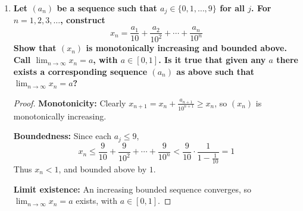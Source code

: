 \documentclass[14pt]{extarticle}
\begin{document}
\begin{enumerate}
\begin{proof}
Simplify the denominator: $2n+2=2(n+1)$, so
\begin{align*}
\frac{(n+1)(2n+1)^2}{n\cdot 4(n+1)^2} &= \frac{(2n+1)^2}{4n(n+1)} \\
&= \frac{4n^2 +4n +1}{4n(n+1)} \\
&= 1 + \frac{1}{4n(n+1)} > 1
\end{align*}

Hence
\[
(n+1)x_{n+1}^2 > n x_n^2
\]
so $nx_n^2$ is monotonically increasing

\medskip

Consider the ratio
\[
\frac{(n+3/2)x_{n+1}^2}{(n+1/2)x_n^2} = \frac{n+3/2}{n+1/2} \left(\frac{2n+1}{2n+2}\right)^2
= \frac{n+3/2}{n+1/2} \cdot \frac{(2n+1)^2}{(2n+2)^2}
\]

Write $2n+2 = 2(n+1)$:
\begin{align*}
\frac{n+3/2}{n+1/2} \cdot \frac{(2n+1)^2}{4(n+1)^2} &= \frac{2n+3}{2n+1} \cdot \frac{(2n+1)^2}{4(n+1)^2}\\ &= \frac{2n+3}{4(n+1)^2} (2n+1)
\\&= \frac{(2n+1)(2n+3)}{4(n+1)^2}
\end{align*}

Observe
\[
(2n+1)(2n+3) = 4n^2 + 8n +3 < 4n^2 + 8n +4 = 4(n+1)^2
\]

Thus the ratio is less than $1$, so 
\[
\bigl(n+\frac12\bigr)x_n^2
\] 
is monotonically decreasing

\end{proof}


\newpage
\item \textbf{Let $(a_n)$ be a sequence such that $a_j\in\{0,1,\dots,9\}$ for all $j$. For $n=1,2,3,\dots$, construct
\[
x_n=\frac{a_1}{10}+\frac{a_2}{10^2}+\cdots+\frac{a_n}{10^n}
\]
Show that $(x_n)$ is monotonically increasing and bounded above. Call $\lim_{n\to\infty}x_n=a$, with $a\in[0,1]$. Is it true that given any $a$ there exists a corresponding sequence $(a_n)$ as above such that $\lim_{n\to\infty}x_n=a$?}

\begin{proof}
\textbf{Monotonicity:} 
Clearly $x_{n+1}=x_n+\tfrac{a_{n+1}}{10^{n+1}}\ge x_n$, so $(x_n)$ is monotonically increasing.

\medskip
\textbf{Boundedness:} 
Since each $a_j\le9$,
\[
x_n\le\frac{9}{10}+\frac{9}{10^2}+\cdots+\frac{9}{10^n}<\frac{9}{10}\cdot\frac{1}{1-\tfrac1{10}}=1
\]
Thus $x_n<1$, and bounded above by $1$.

\medskip
\textbf{Limit existence:} 
An increasing bounded sequence converges, so $\lim_{n\to\infty}x_n=a$ exists, with $a\in[0,1]$.


\end{proof}
\end{enumerate}
\end{document}

